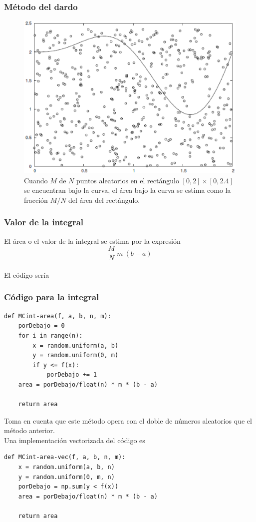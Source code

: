 \begin{frame}
\frametitle{Método del dardo}
\begin{figure}
	\centering
	\includegraphics[scale=0.4]{Imagenes/integracionCaja.eps}
	\caption{\tiny{Cuando $M$ de $N$ puntos aleatorios en el rectángulo $[0, 2] \times [0, 2.4]$ se encuentran bajo la curva, el área bajo la curva se estima como la fracción $M / N$ del área del rectángulo.}}
\end{figure}
\end{frame}
\begin{frame}
\frametitle{Valor de la integral}
El área o el valor de la integral se estima por la expresión
\[ \dfrac{M}{N} \: m \: (b - a) \]
\\
\bigskip
El código sería
\end{frame}
\begin{frame}
\frametitle{Código para la integral}
\begin{lstlisting}[caption=Código para el método del dardo, style=FormattedNumber, basicstyle=\linespread{1.1}\ttfamily=\small, columns=fullflexible]
def MCint-area(f, a, b, n, m):
    porDebajo = 0 
    for i in range(n):
        x = random.uniform(a, b)
        y = random.uniform(0, m)
        if y <= f(x):
            porDebajo += 1
    area = porDebajo/float(n) * m * (b - a)
    
    return area
\end{lstlisting}
\end{frame}
\begin{frame}[fragile]
Toma en cuenta que este método opera con el doble de números aleatorios que el método anterior.
\\
\bigskip
Una implementación vectorizada del código es
\begin{lstlisting}[caption=Método del dardo en modo vectorizado, style=FormattedNumber, basicstyle=\linespread{1.1}\ttfamily=\small, columns=fullflexible]
def MCint-area-vec(f, a, b, n, m):
    x = random.uniform(a, b, n)
    y = random.uniform(0, m, n)
    porDebajo = np.sum(y < f(x))
    area = porDebajo/float(n) * m * (b - a)
    
    return area
\end{lstlisting}
\end{frame}
